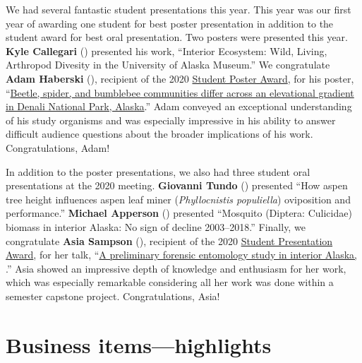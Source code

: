 We had several fantastic student presentations this year. This year was our first year of awarding one student for best poster presentation in addition to the student award for best oral presentation. Two posters were presented this year. \textbf{Kyle Callegari} () presented his work, ``Interior Ecosystem: Wild, Living, Arthropod Divesity in the University of Alaska Museum.'' We congratulate \textbf{Adam Haberski} (), recipient of the 2020 \href{http://www.akentsoc.org/student-presentation-award}{Student Poster Award}, for his poster, ``\href{http://www.akentsoc.org/doc/Haberski_A_et_al_2020.pdf}{Beetle, spider, and bumblebee communities differ across an elevational gradient in Denali National Park, Alaska}.'' Adam conveyed an exceptional understanding of his study organisms and was especially impressive in his ability to answer difficult audience questions about the broader implications of his work. Congratulations, Adam!

In addition to the poster presentations, we also had three student oral presentations at the 2020 meeting. \textbf{Giovanni Tundo} () presented ``How aspen tree height influences aspen leaf miner (\textit{Phyllocnistis populiella}) oviposition and performance.'' \textbf{Michael Apperson} () presented ``Mosquito (Diptera: Culicidae) biomass in interior Alaska: No sign of decline 2003--2018.'' Finally, we congratulate \textbf{Asia Sampson} (), recipient of the 2020 \href{http://www.akentsoc.org/student-presentation-award}{Student Presentation Award}, for her talk, ``\href{http://www.akentsoc.org/doc/Sampson_A_2020.pdf}{A preliminary forensic entomology study in interior Alaska, }.'' Asia showed an impressive depth of knowledge and enthusiasm for her work, which was especially remarkable considering all her work was done within a semester capstone project. Congratulations, Asia!


	
\section{Business items---highlights}

